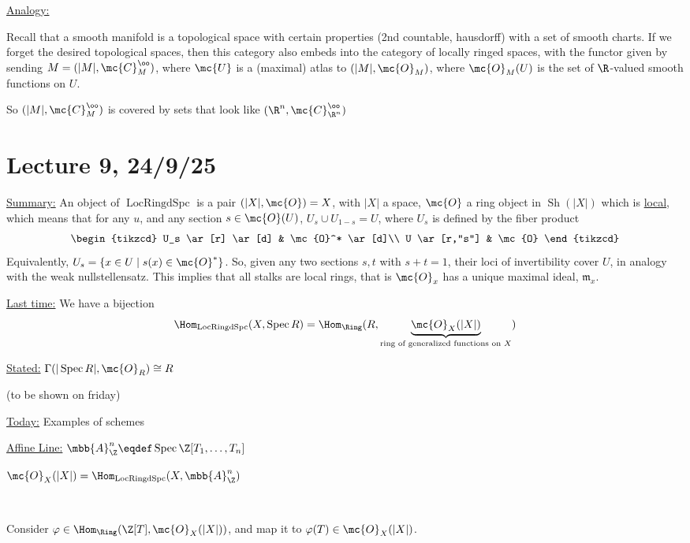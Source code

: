 \documentclass[x11names,reqno,14pt]{extarticle}
\newcommand{\mk}[1]{\mathfrak{#1}}
\DeclareMathOperator{\Spec}{Spec}
\DeclareMathOperator{\Sh}{Sh}
\DeclareMathOperator{\LRS}{LocRingdSpc}
\begin{document}
\underline{Analogy:} 

Recall that a smooth manifold is a topological space with certain properties (2nd countable, hausdorff) with a set of smooth charts. If we forget the desired topological spaces, then this category also embeds into the category of locally ringed spaces, with the functor given by sending $M = (|M|, \mc{C}^\oo_M)$, where $\mc{U}$ is a (maximal) atlas to $(|M|, \mc{O}_M)$, where $\mc{O}_M(U)$ is the set of $\R$-valued smooth functions on $U$. 

So $(|M|,\mc{C}^\oo_M)$ is covered by sets that look like $(\R^n, \mc{C}^\oo_{\R^n})$

\section*{Lecture 9, 24/9/25}

\underline{Summary:} An object of $\operatorname{LocRingdSpc}$ is a pair $(|X|,\mc{O}) = X$, with $|X|$ a space, $\mc{O}$ a ring object in $\Sh(|X|)$ which is \underline{local}, which means that for any $u$, and any section $s \in \mc{O}(U)$, $U_s \cup U_{1-s} = U$, where $U_s$ is defined by the fiber product
\[
\begin{tikzcd}
U_s \ar[r] \ar[d] & \mc{O}^* \ar[d]\\
U \ar[r,"s"] & \mc{O}
\end{tikzcd}
\]
Equivalently, $U_s = \{x\in U \mid s(x) \in \mc{O}^*\}$.
So, given any two sections $s, t$ with $s + t = 1$, their loci of invertibility cover $U$, in analogy with the weak nullstellensatz. This implies that all stalks are local rings, that is $\mc{O}_x$ has a unique maximal ideal, $\mk{m}_x$.

\underline{Last time:} We have a bijection 
\[
\Hom_{\LRS}(X,\Spec R) = \Hom_{\Ring}(R,\underbrace{\mc{O}_X(|X|)}_{\text{ring of generalized functions on $X$}})
\]

\underline{Stated:} $\Gamma(|\Spec R|,\mc{O}_R) \cong R$

(to be shown on friday)

\underline{Today:} Examples of schemes

\underline{Affine Line:} $\mbb{A}_{\Z}^n \eqdef \Spec \Z[T_1,\dots, T_n]$

\cor 

$\mc{O}_X(|X|) = \Hom_{\LRS}(X, \mbb{A}^n_\Z)$

\proof
\,

Consider $\varphi \in \Hom_{\Ring}(\Z[T], \mc{O}_X(|X|))$, and map it to $\varphi(T) \in \mc{O}_X(|X|)$.
\end{document}

